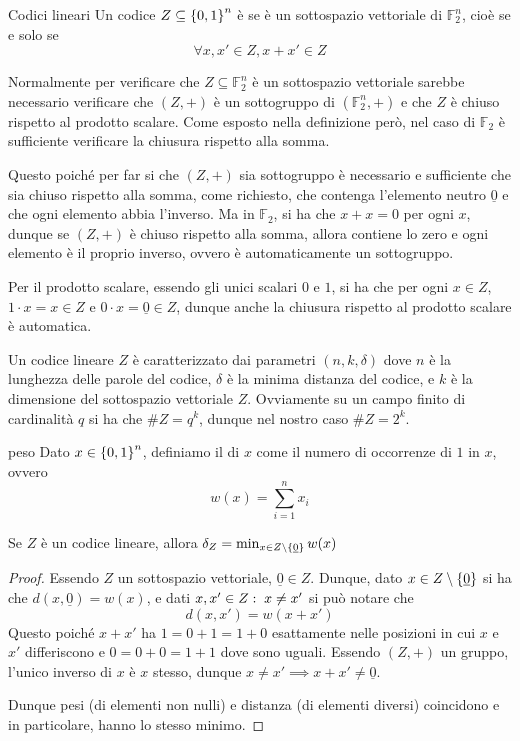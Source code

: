 \begin{definition}{Codici lineari}
  Un codice \(Z \subseteq \set{0,1}^n\) è  se è un sottospazio vettoriale di \(\mathbb{F}_2^n\), cioè se e solo se
  \[\forall x,x'\in Z, x+x'\in Z \]
\end{definition}

Normalmente per verificare che \(Z \subseteq \mathbb{F}_2^n\) è un sottospazio vettoriale sarebbe necessario verificare che \((Z, +)\) è un sottogruppo di \((\mathbb{F}_2^n,+)\) e che \(Z\) è chiuso rispetto al prodotto scalare.
Come esposto nella definizione però, nel caso di \(\mathbb{F}_2\) è sufficiente verificare la chiusura rispetto alla somma.

Questo poiché per far si che \((Z,+)\) sia sottogruppo è necessario e sufficiente che sia chiuso rispetto alla somma, come richiesto, che contenga l'elemento neutro \(\underline{0}\) e che ogni elemento abbia l'inverso.
Ma in \(\mathbb{F}_2\), si ha che \(x+x=0\) per ogni \(x\), dunque se \((Z,+)\) è chiuso rispetto alla somma, allora contiene lo zero e ogni elemento è il proprio inverso, ovvero è automaticamente un sottogruppo.

Per il prodotto scalare, essendo gli unici scalari \(0\) e \(1\), si ha che per ogni \(x \in Z\), \(1\cdot x = x \in Z\) e \(0\cdot x = \underline{0} \in Z\), dunque anche la chiusura rispetto al prodotto scalare è automatica.

Un codice lineare \(Z\) è caratterizzato dai parametri \((n,k,\delta)\) dove \(n\) è la lunghezza delle parole del codice, \(\delta\) è la minima distanza del codice, e \(k\) è la dimensione del sottospazio vettoriale \(Z\).
Ovviamente su un campo finito di cardinalità \(q\) si ha che \(\#Z = q^k\), dunque nel nostro caso \(\#Z = 2^k\).

\begin{definition}{peso}
  Dato \(x \in \set{0,1}^n\), definiamo il  di \(x\) come il numero di occorrenze di \(1\) in \(x\), ovvero
  \[w(x) = \sum_{i=1}^n x_i\]
\end{definition}

\begin{proposition}{}
  Se \(Z\) è un codice lineare, allora \(\delta_Z = \min_{x\in Z\setminus\set{\underline{0}}} w(x)\)
\end{proposition}
\begin{proof}
  Essendo \(Z\) un sottospazio vettoriale, \(\underline{0}\in Z\).
  Dunque, dato \(x\in Z\setminus\set{\underline{0}}\) si ha che \(d(x,\underline{0}) = w(x)\), e dati \(x,x' \in Z :\; x\neq x'\) si può notare che
  \[d(x,x') = w(x+x')\]
  Questo poiché \(x+x'\) ha \(1 = 0 +1 = 1+ 0\) esattamente nelle posizioni in cui \(x\) e \(x'\) differiscono e \(0 = 0 +0 = 1+1\) dove sono uguali.
  Essendo \((Z,+)\) un gruppo, l'unico inverso di \(x\) è \(x\) stesso, dunque \(x\neq x' \implies x+x'\neq \underline{0}\).

  Dunque pesi (di elementi non nulli) e distanza (di elementi diversi) coincidono e in particolare, hanno lo stesso minimo.
\end{proof}

